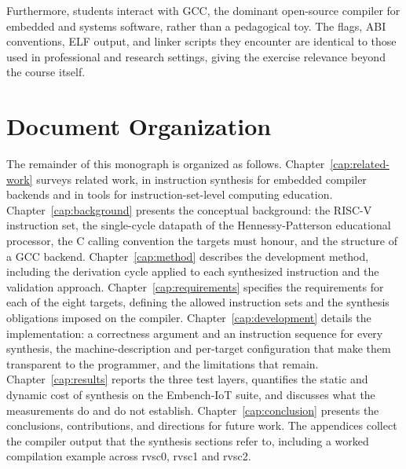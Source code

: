 Furthermore, students interact with GCC, the dominant open-source compiler for embedded and systems
software, rather than a pedagogical toy. The flags, ABI conventions, ELF output, and linker scripts
they encounter are identical to those used in professional and research settings, giving the exercise
relevance beyond the course itself.

\section{Document Organization}

The remainder of this monograph is organized as follows.
Chapter~\ref{cap:related-work} surveys related work, in instruction synthesis for embedded compiler
backends and in tools for instruction-set-level computing education.
Chapter~\ref{cap:background} presents the conceptual background: the RISC-V instruction set, the
single-cycle datapath of the Hennessy-Patterson educational processor, the C calling convention the
targets must honour, and the structure of a GCC backend.
Chapter~\ref{cap:method} describes the development method, including the derivation cycle applied to
each synthesized instruction and the validation approach.
Chapter~\ref{cap:requirements} specifies the requirements for each of the eight targets, defining
the allowed instruction sets and the synthesis obligations imposed on the compiler.
Chapter~\ref{cap:development} details the implementation: a correctness argument and an instruction
sequence for every synthesis, the machine-description and per-target configuration that make them
transparent to the programmer, and the limitations that remain.
Chapter~\ref{cap:results} reports the three test layers, quantifies the static and dynamic cost of
synthesis on the Embench-IoT suite, and discusses what the measurements do and do not establish.
Chapter~\ref{cap:conclusion} presents the conclusions, contributions, and directions for future work.
The appendices collect the compiler output that the synthesis sections refer to, including a worked
compilation example across rvsc0, rvsc1 and rvsc2.
